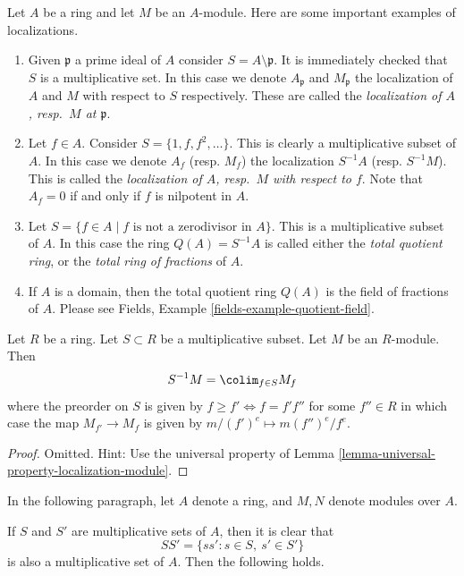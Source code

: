 \begin{example}
\label{example-localize-at-prime}
Let $A$ be a ring and let $M$ be an $A$-module.
Here are some important examples of localizations.
\begin{enumerate}
\item Given $\mathfrak p$ a prime ideal of $A$ consider
$S = A\setminus\mathfrak p$. It is
immediately checked that $S$ is a multiplicative set. In this case
we denote $A_\mathfrak p$ and $M_\mathfrak p$ the localization of
$A$ and $M$ with respect to $S$ respectively. These are
called the {\it localization of $A$, resp.\ $M$ at $\mathfrak p$}.
\item Let $f\in A$. Consider $S = \{1, f, f^2, \ldots\}$.
This is clearly a multiplicative subset of $A$.
In this case we denote $A_f$
(resp. $M_f$) the localization $S^{-1}A$ (resp. $S^{-1}M$).
This is called the {\it localization of $A$, resp.\ $M$ with
respect to $f$}.
Note that $A_f = 0$ if and only if $f$ is nilpotent in $A$.
\item Let $S = \{f \in A \mid f \text{ is not a zerodivisor in }A\}$.
This is a multiplicative subset of $A$. In this case the
ring $Q(A) = S^{-1}A$ is called either the
{\it total quotient ring}, or the {\it total ring of fractions}
of $A$.
\item If $A$ is a domain, then the total quotient ring $Q(A)$ is
the field of fractions of $A$. Please see
Fields, Example \ref{fields-example-quotient-field}.
\end{enumerate}
\end{example}

\begin{lemma}
\label{lemma-localization-colimit}
Let $R$ be a ring.
Let $S \subset R$ be a multiplicative subset.
Let $M$ be an $R$-module.
Then
$$
S^{-1}M = \colim_{f \in S} M_f
$$
where the preorder on $S$ is given by
$f \geq f' \Leftrightarrow f = f'f''$ for some $f'' \in R$
in which case the map $M_{f'} \to M_f$ is given
by $m/(f')^e \mapsto m(f'')^e/f^e$.
\end{lemma}

\begin{proof}
Omitted. Hint: Use the universal property of
Lemma \ref{lemma-universal-property-localization-module}.
\end{proof}

\noindent
In the following paragraph,
let $A$ denote a ring,
and $M, N$ denote modules over $A$.

\medskip\noindent
If $S$ and $S'$ are multiplicative sets of $A$, then it is
clear that
$$
SS' = \{ss' : s\in S, \ s'\in S'\}
$$
is also a multiplicative set of $A$. Then the following holds.

